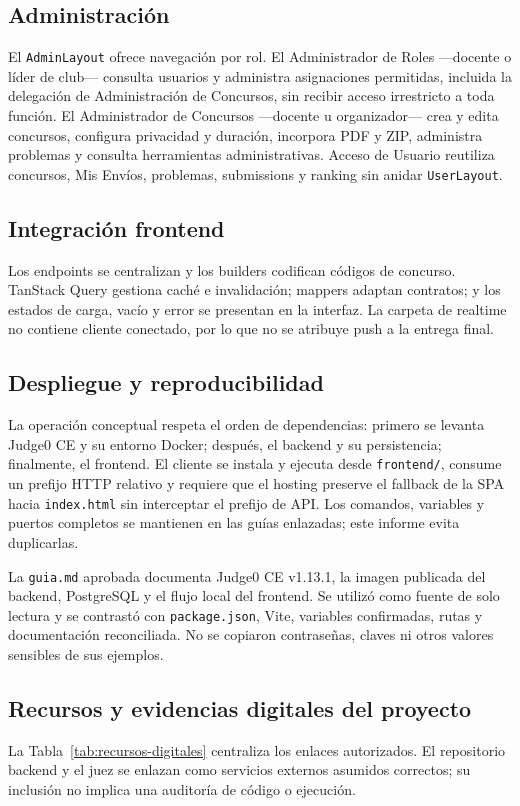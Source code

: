 \documentclass[11pt,a4paper]{article}
\begin{document}
\subsection{Administración}
El \texttt{AdminLayout} ofrece navegación por rol. El Administrador de Roles —docente o líder de club— consulta usuarios y administra asignaciones permitidas, incluida la delegación de Administración de Concursos, sin recibir acceso irrestricto a toda función. El Administrador de Concursos —docente u organizador— crea y edita concursos, configura privacidad y duración, incorpora PDF y ZIP, administra problemas y consulta herramientas administrativas. Acceso de Usuario reutiliza concursos, Mis Envíos, problemas, submissions y ranking sin anidar \texttt{UserLayout}.

\subsection{Integración frontend}
Los endpoints se centralizan y los builders codifican códigos de concurso. TanStack Query gestiona caché e invalidación; mappers adaptan contratos; y los estados de carga, vacío y error se presentan en la interfaz. La carpeta de realtime no contiene cliente conectado, por lo que no se atribuye push a la entrega final.

\subsection{Despliegue y reproducibilidad}
La operación conceptual respeta el orden de dependencias: primero se levanta Judge0 CE y su entorno Docker; después, el backend y su persistencia; finalmente, el frontend. El cliente se instala y ejecuta desde \texttt{frontend/}, consume un prefijo HTTP relativo y requiere que el hosting preserve el fallback de la SPA hacia \texttt{index.html} sin interceptar el prefijo de API. Los comandos, variables y puertos completos se mantienen en las guías enlazadas; este informe evita duplicarlas.

La \texttt{guia.md} aprobada documenta Judge0 CE v1.13.1, la imagen publicada del backend, PostgreSQL y el flujo local del frontend. Se utilizó como fuente de solo lectura y se contrastó con \texttt{package.json}, Vite, variables confirmadas, rutas y documentación reconciliada. No se copiaron contraseñas, claves ni otros valores sensibles de sus ejemplos.

\subsection{Recursos y evidencias digitales del proyecto}
La Tabla~\ref{tab:recursos-digitales} centraliza los enlaces autorizados. El repositorio backend y el juez se enlazan como servicios externos asumidos correctos; su inclusión no implica una auditoría de código o ejecución.
\end{document}
